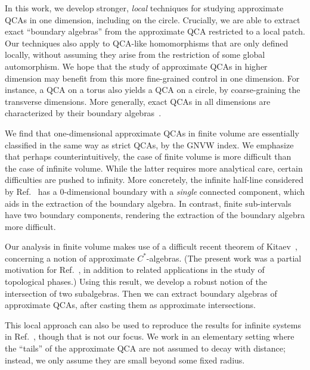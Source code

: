 \documentclass[11pt,reqno]{amsart}
\theoremstyle{definition}
\theoremstyle{remark}
\numberwithin{equation}{section}
\begin{document}
In this work, we develop stronger, \emph{local} techniques for studying approximate QCAs in one dimension, including on the circle.
Crucially, we are able to extract exact ``boundary algebras'' \cite{freedman2020classification, haah2023invertible} from the approximate QCA restricted to a local patch.
Our techniques also apply to QCA-like homomorphisms that are only defined locally, without assuming they arise from the restriction of some global automorphism.
We hope that the study of approximate QCAs in higher dimension may benefit from this more fine-grained control in one dimension.
 For instance, a QCA on a torus also yields a QCA on a circle, by coarse-graining the transverse dimensions.
 More generally, exact QCAs in all dimensions are characterized by their boundary algebras~\cite{haah2023invertible}.

We find that one-dimensional approximate QCAs in finite volume are essentially classified in the same way as strict QCAs, by the GNVW index.
We emphasize that perhaps counterintuitively, the case of finite volume is more difficult than the case of infinite volume.
While the latter requires more analytical care, certain difficulties are pushed to infinity.
More concretely, the infinite half-line considered by Ref.~\cite{ranard2022converse} has a $0$-dimensional boundary with a \textit{single} connected component, which aids in the extraction of the boundary algebra. In contrast, finite sub-intervals have two boundary components, rendering the extraction of the boundary algebra more difficult.

Our analysis in finite volume makes use of a difficult recent theorem of Kitaev~\cite{kitaev2024almost}, concerning a notion of approximate $C^*$-algebras.
(The present work was a partial motivation for Ref.~\cite{kitaev2024almost}, in addition to related applications in the study of topological phases.)
Using this result, we develop a robust notion of the intersection of two subalgebras.  Then we can extract boundary algebras of approximate QCAs, after casting them as approximate intersections.

This local approach can also be used to reproduce the results for infinite systems in Ref.~\cite{ranard2022converse}, though that is not our focus. We work in an elementary setting where the ``tails'' of the approximate QCA are not assumed to decay with distance; instead, we only assume they are small beyond some fixed radius.  
\end{document}
